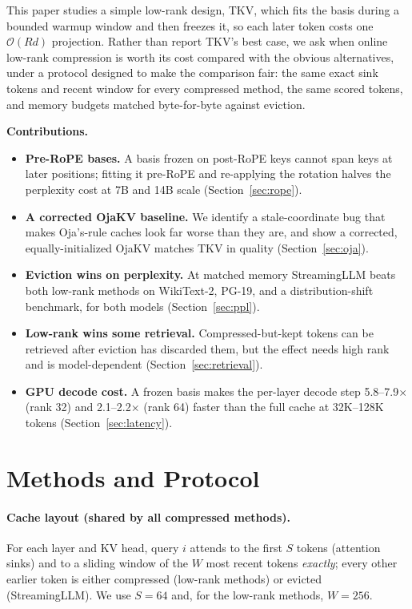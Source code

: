 \documentclass{article}
\begin{document}
This paper studies a simple low-rank design, TKV, which fits the basis during
a bounded warmup window and then freezes it, so each later token costs one
$\mathcal{O}(Rd)$ projection. Rather than report TKV's best case, we ask when
online low-rank compression is worth its cost compared with the obvious
alternatives, under a protocol designed to make the comparison fair: the same
exact sink tokens and recent window for every compressed method, the same
scored tokens, and memory budgets matched byte-for-byte against eviction.

\textbf{Contributions.}
\begin{itemize}[leftmargin=*,itemsep=1pt]
  \item \textbf{Pre-RoPE bases.} A basis frozen on post-RoPE keys cannot span
        keys at later positions; fitting it pre-RoPE and re-applying the
        rotation halves the perplexity cost at 7B and 14B scale
        (Section~\ref{sec:rope}).
  \item \textbf{A corrected OjaKV baseline.} We identify a stale-coordinate bug
        that makes Oja's-rule caches look far worse than they are, and show a
        corrected, equally-initialized OjaKV matches TKV in quality
        (Section~\ref{sec:oja}).
  \item \textbf{Eviction wins on perplexity.} At matched memory StreamingLLM
        beats both low-rank methods on WikiText-2, PG-19, and a
        distribution-shift benchmark, for both models (Section~\ref{sec:ppl}).
  \item \textbf{Low-rank wins some retrieval.} Compressed-but-kept tokens can be
        retrieved after eviction has discarded them, but the effect needs high
        rank and is model-dependent (Section~\ref{sec:retrieval}).
  \item \textbf{GPU decode cost.} A frozen basis makes the per-layer decode step
        5.8--7.9$\times$ (rank 32) and 2.1--2.2$\times$ (rank 64) faster than the
        full cache at 32K--128K tokens (Section~\ref{sec:latency}).
\end{itemize}

\section{Methods and Protocol}
\label{sec:method}

\paragraph{Cache layout (shared by all compressed methods).}
For each layer and KV head, query $i$ attends to the first $S$ tokens
(attention sinks) and to a sliding window of the $W$ most recent tokens
\emph{exactly}; every other earlier token is either compressed (low-rank
methods) or evicted (StreamingLLM). We use $S{=}64$ and, for the low-rank
methods, $W{=}256$.
\end{document}
